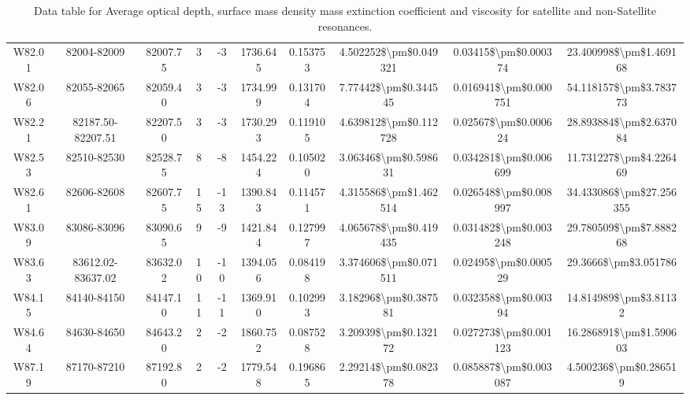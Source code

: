 \documentclass{article}
\begin{document}
\begin{table}[h]
{\begin{tabular}{|c|c|c|c|c|c|c|c|c|c|}
  W82.01 &       82004-82009 &                82007.75 &    3 &   -3 &          1736.645 & 0.153753 & 4.502252\$\textbackslash pm\$0.049321 &  0.03415\$\textbackslash pm\$0.000374 &   23.400998\$\textbackslash pm\$1.469168 \\
  W82.06 &       82055-82065 &                82059.40 &    3 &   -3 &          1734.999 & 0.131704 &  7.77442\$\textbackslash pm\$0.344545 & 0.016941\$\textbackslash pm\$0.000751 &   54.118157\$\textbackslash pm\$3.783773 \\
  W82.21 & 82187.50-82207.51 &                82207.50 &    3 &   -3 &          1730.293 & 0.119105 & 4.639812\$\textbackslash pm\$0.112728 &  0.02567\$\textbackslash pm\$0.000624 &   28.893884\$\textbackslash pm\$2.637084 \\
  W82.53 &       82510-82530 &                82528.75 &    8 &   -8 &          1454.224 & 0.105020 &  3.06346\$\textbackslash pm\$0.598631 & 0.034281\$\textbackslash pm\$0.006699 &   11.731227\$\textbackslash pm\$4.226469 \\
  W82.61 &       82606-82608 &                82607.75 &   15 &  -13 &          1390.843 & 0.114571 & 4.315586\$\textbackslash pm\$1.462514 & 0.026548\$\textbackslash pm\$0.008997 &  34.433086\$\textbackslash pm\$27.256355 \\
  W83.09 &       83086-83096 &                83090.65 &    9 &   -9 &          1421.844 & 0.127997 & 4.065678\$\textbackslash pm\$0.419435 & 0.031482\$\textbackslash pm\$0.003248 &   29.780509\$\textbackslash pm\$7.888268 \\
  W83.63 & 83612.02-83637.02 &                83632.02 &   10 &  -10 &          1394.056 & 0.084198 & 3.374606\$\textbackslash pm\$0.071511 &  0.02495\$\textbackslash pm\$0.000529 &     29.3666\$\textbackslash pm\$3.051786 \\
  W84.15 &       84140-84150 &                84147.10 &   11 &  -11 &          1369.910 & 0.102993 &  3.18296\$\textbackslash pm\$0.387581 &  0.032358\$\textbackslash pm\$0.00394 &    14.814989\$\textbackslash pm\$3.81132 \\
  W84.64 &       84630-84650 &                84643.20 &    2 &   -2 &          1860.752 & 0.087528 &  3.20939\$\textbackslash pm\$0.132172 & 0.027273\$\textbackslash pm\$0.001123 &   16.286891\$\textbackslash pm\$1.590603 \\
  W87.19 &       87170-87210 &                87192.80 &    2 &   -2 &          1779.548 & 0.196865 &  2.29214\$\textbackslash pm\$0.082378 & 0.085887\$\textbackslash pm\$0.003087 &    4.500236\$\textbackslash pm\$0.286519 \\

\hline
\end{tabular}
\vspace{-1.5cm}
}
\caption{Data table for Average optical depth, surface mass density mass extinction coefficient and viscosity for satellite and non-Satellite resonances.}
\end{table}
\end{document}

